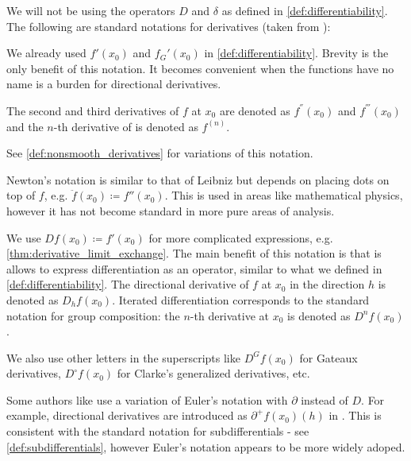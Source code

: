 \begin{remark}\label{remark:derivative_notation}
  We will not be using the operators \( D \) and \( \delta \) as defined in \cref{def:differentiability}. The following are standard notations for derivatives (taken from \cite[146]{Фихтенгольц1968/2}):
  \begin{remenum}
     We already used  \( f'(x_0) \) and \( f_G'(x_0) \) in \cref{def:differentiability}. Brevity is the only benefit of this notation. It becomes convenient when the functions have no name is a burden for directional derivatives.

    The second and third derivatives of \( f \) at \( x_0 \) are denoted as \( f^{''}(x_0) \) and \( f^{'''}(x_0) \) and the \( n \)-th derivative of is denoted as \( f^{(n)} \).

    See \cref{def:nonsmooth_derivatives} for variations of this notation.

     Newton's notation is similar to that of Leibniz but depends on placing dots on top of \( f \), e.g. \( \ddot{f}(x_0) \coloneqq f''(x_0) \). This is used in areas like mathematical physics, however it has not become standard in more pure areas of analysis.

     We use  \( Df(x_0) \coloneqq f'(x_0) \) for more complicated expressions, e.g. \cref{thm:derivative_limit_exchange}. The main benefit of this notation is that is allows to express differentiation as an operator, similar to what we defined in \cref{def:differentiability}. The directional derivative of \( f \) at \( x_0 \) in the direction \( h \) is denoted as \( D_h f(x_0) \). Iterated differentiation corresponds to the standard notation for group composition: the \( n \)-th derivative at \( x_0 \) is denoted as \( D^n f(x_0) \).

    We also use other letters in the superscripts like \( D^G f(x_0) \) for Gateaux derivatives, \( D^\circ f(x_0) \) for Clarke's generalized derivatives, etc.

     Some authors like \cite{Phelps1993} use a variation of Euler's notation with \( \partial \) instead of \( D \). For example, directional derivatives are introduced as \( \partial^+ f(x_0)(h) \) in \cite[lemma 1.2]{Phelps1993}. This is consistent with the standard notation for subdifferentials - see \cref{def:subdifferentials}, however Euler's notation appears to be more widely adoped.


\end{remenum}
\end{remark}
